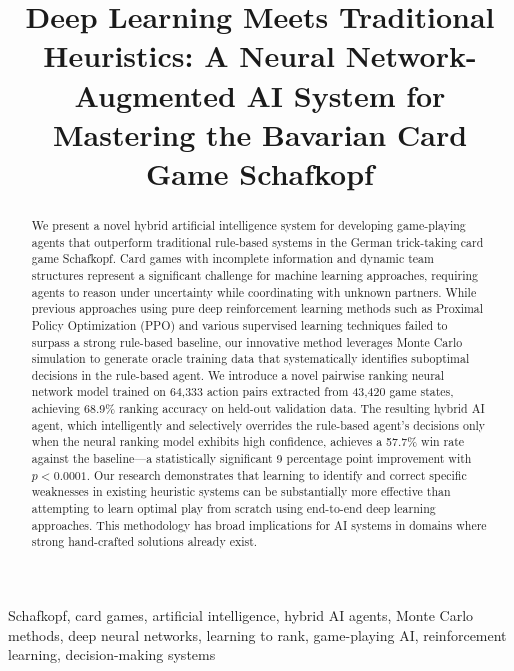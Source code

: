 \documentclass[conference]{IEEEtran}
\begin{document}
\title{Deep Learning Meets Traditional Heuristics: A Neural Network-Augmented AI System for Mastering the Bavarian Card Game Schafkopf}

\author{
}

\maketitle

\begin{abstract}
We present a novel hybrid artificial intelligence system for developing game-playing agents that outperform traditional rule-based systems in the German trick-taking card game Schafkopf. Card games with incomplete information and dynamic team structures represent a significant challenge for machine learning approaches, requiring agents to reason under uncertainty while coordinating with unknown partners. While previous approaches using pure deep reinforcement learning methods such as Proximal Policy Optimization (PPO) and various supervised learning techniques failed to surpass a strong rule-based baseline, our innovative method leverages Monte Carlo simulation to generate oracle training data that systematically identifies suboptimal decisions in the rule-based agent. We introduce a novel pairwise ranking neural network model trained on 64,333 action pairs extracted from 43,420 game states, achieving 68.9\% ranking accuracy on held-out validation data. The resulting hybrid AI agent, which intelligently and selectively overrides the rule-based agent's decisions only when the neural ranking model exhibits high confidence, achieves a 57.7\% win rate against the baseline—a statistically significant 9 percentage point improvement with $p < 0.0001$. Our research demonstrates that learning to identify and correct specific weaknesses in existing heuristic systems can be substantially more effective than attempting to learn optimal play from scratch using end-to-end deep learning approaches. This methodology has broad implications for AI systems in domains where strong hand-crafted solutions already exist.
\end{abstract}

\begin{IEEEkeywords}
Schafkopf, card games, artificial intelligence, hybrid AI agents, Monte Carlo methods, deep neural networks, learning to rank, game-playing AI, reinforcement learning, decision-making systems
\end{IEEEkeywords}
\end{document}
